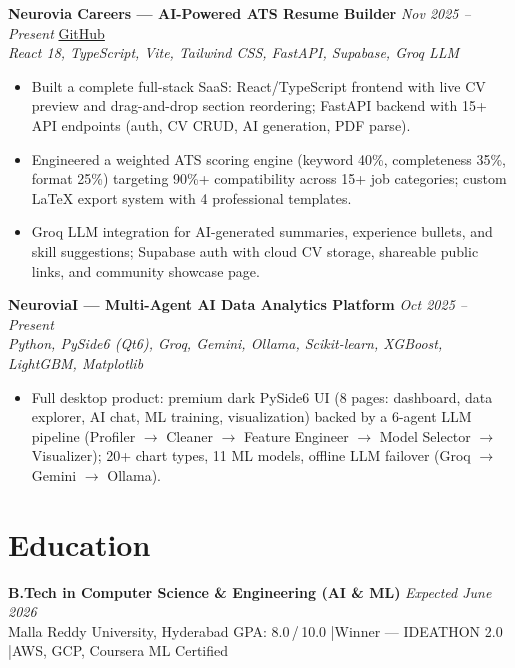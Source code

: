 \documentclass[9.5pt]{article}
\begin{document}
\vspace{1.5pt}
\textbf{Neurovia Careers --- AI-Powered ATS Resume Builder} \hfill \textit{Nov 2025 -- Present} \quad \href{https://github.com/JeetInTech/CvForge-Online}{GitHub}\\
\textit{React 18, TypeScript, Vite, Tailwind CSS, FastAPI, Supabase, Groq LLM}
\begin{itemize}
  \item Built a complete full-stack SaaS: React/TypeScript frontend with live CV preview and drag-and-drop section reordering; FastAPI backend with 15+ API endpoints (auth, CV CRUD, AI generation, PDF parse).
  \item Engineered a weighted ATS scoring engine (keyword 40\%, completeness 35\%, format 25\%) targeting 90\%+ compatibility across 15+ job categories; custom LaTeX export system with 4 professional templates.
  \item Groq LLM integration for AI-generated summaries, experience bullets, and skill suggestions; Supabase auth with cloud CV storage, shareable public links, and community showcase page.
\end{itemize}

\vspace{1.5pt}
\textbf{NeuroviaI --- Multi-Agent AI Data Analytics Platform} \hfill \textit{Oct 2025 -- Present}\\
\textit{Python, PySide6 (Qt6), Groq, Gemini, Ollama, Scikit-learn, XGBoost, LightGBM, Matplotlib}
\begin{itemize}
  \item Full desktop product: premium dark PySide6 UI (8 pages: dashboard, data explorer, AI chat, ML training, visualization) backed by a 6-agent LLM pipeline (Profiler $\rightarrow$ Cleaner $\rightarrow$ Feature Engineer $\rightarrow$ Model Selector $\rightarrow$ Visualizer); 20+ chart types, 11 ML models, offline LLM failover (Groq $\rightarrow$ Gemini $\rightarrow$ Ollama).
\end{itemize}

\section*{Education}
\textbf{B.Tech in Computer Science \& Engineering (AI \& ML)} \hfill \textit{Expected June 2026}\\
Malla Reddy University, Hyderabad \hfill GPA: 8.0\,/\,10.0 \quad|\quad Winner --- IDEATHON 2.0 \quad|\quad AWS, GCP, Coursera ML Certified
\end{document}
